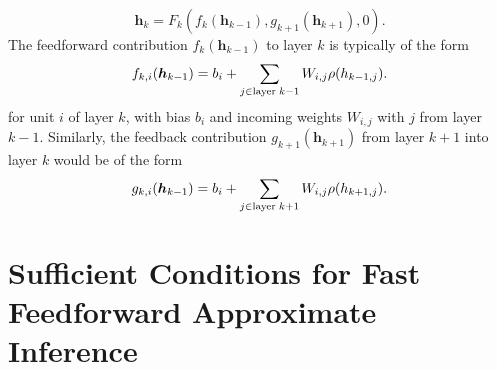 \documentclass{article}
\newcommand   \vh{{\bm h}}
\begin{document}
\begin{equation}
 \vh_k = F_k(f_k(\vh_{k-1}),g_{k+1}(\vh_{k+1}),0).
\end{equation}
The feedforward contribution $f_k(\vh_{k-1})$ to layer $k$ is typically of the form
\begin{equation}
   f_{k,i}(\vh_{k-1}) = b_i + \sum_{j \in {\rm layer}\; k-1} W_{i,j} \rho(h_{k-1,j}).
\end{equation}
for unit $i$ of layer $k$, with bias $b_i$ and incoming weights $W_{i,j}$ with $j$ from layer $k-1$.
Similarly, the feedback contribution $g_{k+1}(\vh_{k+1})$ from layer $k+1$ into layer $k$ would
be of the form
\begin{equation}
   g_{k,i}(\vh_{k-1}) = b_i + \sum_{j \in {\rm layer}\; k+1} W_{i,j} \rho(h_{k+1,j}).
\end{equation}


\section{Sufficient Conditions for Fast Feedforward Approximate Inference}
\end{document}
